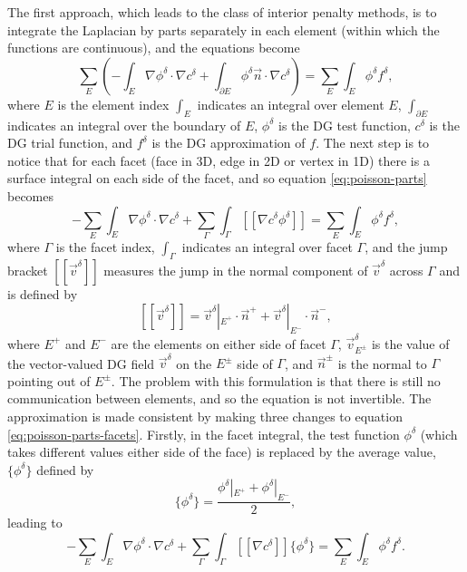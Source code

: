The first approach, which leads to the class of interior penalty
methods, is to integrate the Laplacian by parts separately in each
element (within which the functions are continuous), and the equations
become
\begin{equation}
\label{eq:poisson-parts}
\sum_E\left(-\int_E\nabla \phi^\delta\cdot\nabla c^\delta +
 \int_{\partial E} \phi^\delta \vec{n}\cdot\nabla c^\delta\right) = 
\sum_E\int_E \phi^\delta f^{\delta},
\end{equation}
where $E$ is the element index $\int_E$ indicates an integral over
element $E$, $\int_{\partial E}$ indicates an integral over the
boundary of $E$, $\phi^\delta$ is the DG test function, $c^\delta$ is
the DG trial function, and $f^\delta$ is the DG approximation of $f$.
The next step is to notice that for each facet (face in 3D, edge in 2D
or vertex in 1D) there is a surface integral on each side of the
facet, and so equation \eqref{eq:poisson-parts} becomes 
\begin{equation}
\label{eq:poisson-parts-facets}
-\sum_E\int_E\nabla \phi^\delta\cdot\nabla c^\delta +
\sum_\Gamma\int_{\Gamma} [[\nabla c^\delta{\phi}^\delta]] = 
\sum_E\int_E \phi^\delta f^{\delta},
\end{equation}
where $\Gamma$ is the facet index, $\int_{\Gamma}$ indicates an
integral over facet $\Gamma$, and the jump bracket
$[[\vec{v}^\delta]]$ measures the jump in the normal component of
$\vec{v}^\delta$ across $\Gamma$ and is defined by
\[
[[\vec{v}^\delta]] = \vec{v}^\delta|_{E^+}\cdot\vec{n}^+ + 
\vec{v}^\delta|_{E^-}\cdot\vec{n}^-,
\]
where $E^+$ and $E^-$ are the elements on either side of facet
$\Gamma$, $\vec{v}^\delta_{E^{\pm}}$ is the value of the vector-valued
DG field $\vec{v}^\delta$ on the $E^{\pm}$ side of $\Gamma$, and
$\vec{n}^{\pm}$ is the normal to $\Gamma$ pointing out of
$E^{\pm}$. The problem with this formulation is that there is still no
communication between elements, and so the equation is not
invertible. The approximation is made consistent by making three
changes to equation \eqref{eq:poisson-parts-facets}. Firstly, in the
facet integral, the test function $\phi^\delta$ (which takes different
values either side of the face) is replaced by the average value, 
$\{\phi^\delta\}$ defined by
\[
\{\phi^\delta\} = \frac{\phi^\delta|_{E^+} + \phi^\delta|_{E^-}}{2},
\]
leading to 
\begin{equation}
\label{eq:poisson-parts-facets-average}
-\sum_E\int_E\nabla \phi^\delta\cdot\nabla c^\delta +
\sum_\Gamma\int_{\Gamma} [[\nabla c^\delta]]\{\phi^\delta\} = 
\sum_E\int_E \phi^\delta f^{\delta}.
\end{equation}

